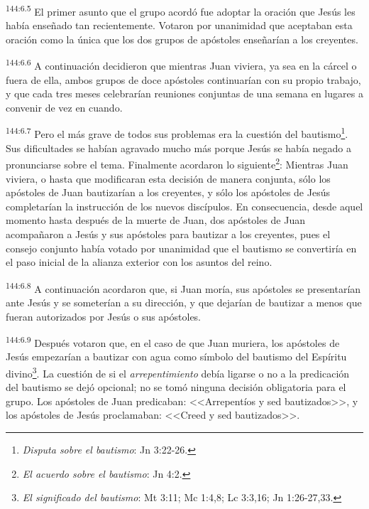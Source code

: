 \par 
\textsuperscript{144:6.5} El primer asunto que el grupo acordó fue adoptar la oración que Jesús les había enseñado tan recientemente. Votaron por unanimidad que aceptaban esta oración como la única que los dos grupos de apóstoles enseñarían a los creyentes.

\par 
\textsuperscript{144:6.6} A continuación decidieron que mientras Juan viviera, ya sea en la cárcel o fuera de ella, ambos grupos de doce apóstoles continuarían con su propio trabajo, y que cada tres meses celebrarían reuniones conjuntas de una semana en lugares a convenir de vez en cuando.

\par 
\textsuperscript{144:6.7} Pero el más grave de todos sus problemas era la cuestión del bautismo\footnote{\textit{Disputa sobre el bautismo}: Jn 3:22-26.}. Sus dificultades se habían agravado mucho más porque Jesús se había negado a pronunciarse sobre el tema. Finalmente acordaron lo siguiente\footnote{\textit{El acuerdo sobre el bautismo}: Jn 4:2.}: Mientras Juan viviera, o hasta que modificaran esta decisión de manera conjunta, sólo los apóstoles de Juan bautizarían a los creyentes, y sólo los apóstoles de Jesús completarían la instrucción de los nuevos discípulos. En consecuencia, desde aquel momento hasta después de la muerte de Juan, dos apóstoles de Juan acompañaron a Jesús y sus apóstoles para bautizar a los creyentes, pues el consejo conjunto había votado por unanimidad que el bautismo se convertiría en el paso inicial de la alianza exterior con los asuntos del reino.

\par 
\textsuperscript{144:6.8} A continuación acordaron que, si Juan moría, sus apóstoles se presentarían ante Jesús y se someterían a su dirección, y que dejarían de bautizar a menos que fueran autorizados por Jesús o sus apóstoles.

\par 
\textsuperscript{144:6.9} Después votaron que, en el caso de que Juan muriera, los apóstoles de Jesús empezarían a bautizar con agua como símbolo del bautismo del Espíritu divino\footnote{\textit{El significado del bautismo}: Mt 3:11; Mc 1:4,8; Lc 3:3,16; Jn 1:26-27,33.}. La cuestión de si el \textit{arrepentimiento} debía ligarse o no a la predicación del bautismo se dejó opcional; no se tomó ninguna decisión obligatoria para el grupo. Los apóstoles de Juan predicaban: <<Arrepentíos y sed bautizados>>, y los apóstoles de Jesús proclamaban: <<Creed y sed bautizados>>.

